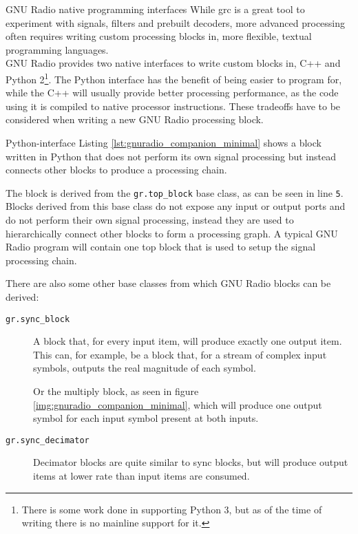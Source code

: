 \begin{subchapter}{GNU Radio native programming interfaces}
  While \gls{grc} is a great tool to experiment with signals,
  filters and prebuilt decoders, more advanced processing
  often requires writing custom processing blocks in, more flexible,
  textual programming languages. \\

  GNU Radio provides two native interfaces to write custom
  blocks in, C++ and Python 2\footnote{There is some work done
  in supporting Python 3, but as of the time of writing there is no
  mainline support for it.}.
  The Python interface has the benefit of being easier to program
  for, while the C++ will usually provide better processing performance,
  as the code using it is compiled to native processor instructions.
  These tradeoffs have to be considered when writing a
  new GNU Radio processing block.

  \begin{subsubchapter}{Python-interface}
    Listing \ref{lst:gnuradio_companion_minimal} shows a block written
    in Python that does not perform its own signal processing but
    instead connects other blocks to produce a processing chain.

    The block is derived from the \texttt{gr.top\_block} base class,
    as can be seen in line \texttt{5}. Blocks derived from this base class
    do not expose any input or output ports and do not perform their own
    signal processing, instead they are used to hierarchically connect
    other blocks to form a processing graph.
    A typical GNU Radio program will contain one top block that is
    used to setup the signal processing chain.

    There are also some other base classes from which GNU Radio
    blocks can be derived\cite{grblockscodingguide}:

    \begin{description}
      \item[\texttt{gr.sync\_block}]
        A block that, for every input item, will produce exactly
        one output item. This can, for example, be a block that,
        for a stream of complex input symbols, outputs the real
        magnitude of each symbol.

        Or the multiply block, as seen in figure
        \ref{img:gnuradio_companion_minimal}, which will produce one
        output symbol for each input symbol present at both inputs.

      \item[\texttt{gr.sync\_decimator}]
        Decimator blocks are quite similar to sync blocks,
        but will produce output items at lower rate than input items
        are consumed.


\end{description}
\end{subsubchapter}
\end{subchapter}
